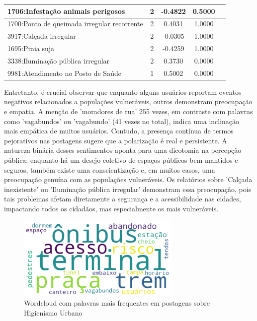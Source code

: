 \begin{table}[htbp]
\begin{tabular}{|l|c|c|c|c|}
		\hline
		1706:Infestação animais perigosos                     & 2                & -0.4822        & 0.5000           \\
		\hline
		1700:Ponto de queimada irregular recorrente           & 2                & 0.4031         & 1.0000           \\
		\hline
		3917:Calçada irregular                                & 2                & -0.0305        & 1.0000           \\
		\hline
		1695:Praia suja                                       & 2                & -0.4259        & 1.0000           \\
		\hline
		3338:Iluminação pública irregular                     & 2                & 0.3730         & 0.0000           \\
		\hline
		9981:Atendimento no Posto de Saúde                    & 1                & 0.5002         & 0.0000           \\
		\hline
	\end{tabular}
\end{table}

Entretanto, é crucial observar que enquanto alguns usuários reportam eventos negativos relacionados a populações vulneráveis, outros demonstram preocupação e empatia. A menção de 'moradores de rua' 255 vezes, em contraste com palavras como 'vagabundos' ou 'vagabundo' (41 vezes no total), indica uma inclinação mais empática de muitos usuários. Contudo, a presença contínua de termos pejorativos nas postagens sugere que a polarização é real e persistente. A natureza binária desses sentimentos aponta para uma dicotomia na percepção pública: enquanto há um desejo coletivo de espaços públicos bem mantidos e seguros, também existe uma conscientização e, em muitos casos, uma preocupação genuína com as populações vulneráveis. Os relatórios sobre 'Calçada inexistente' ou 'Iluminação pública irregular' demonstram essa preocupação, pois tais problemas afetam diretamente a segurança e a acessibilidade nas cidades, impactando todos os cidadãos, mas especialmente os mais vulneráveis.

\begin{figure}[htb]
	\centering
	\includegraphics[width=0.7\textwidth]{images/wordcloud_homepand.png}
	\caption{Wordcloud com palavras mais frequentes em postagens sobre Higienismo Urbano}
	\label{fig:wordcloud_homepand}
\end{figure}

